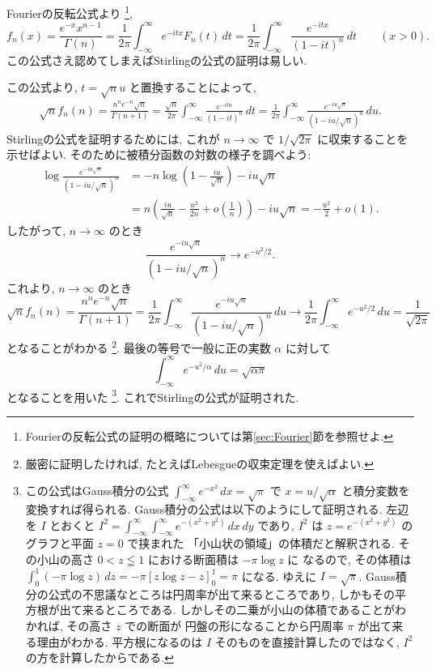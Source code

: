 \documentclass[12pt,twoside]{jarticle}
\theoremstyle{jplain}
\theoremstyle{jplain}
\theoremstyle{jplain}
\numberwithin{theorem}{section}
\numberwithin{equation}{section}
\numberwithin{figure}{section}
\numberwithin{table}{section}
\newcommand\secref[1]{第\ref{#1}節}
\begin{document}
Fourierの反転公式より%
\footnote{Fourierの反転公式の証明の概略については\secref{sec:Fourier}を参照せよ.},
\[
f_n(x)
=
\frac{e^{-x} x^{n-1}}{\Gamma(n)}
=
\frac{1}{2\pi}\int_{-\infty}^\infty e^{-itx}F_n(t)\,dt
=
\frac{1}{2\pi}\int_{-\infty}^\infty \frac{e^{-itx}}{(1-it)^n}\,dt
\qquad (x>0).
\]
この公式さえ認めてしまえばStirlingの公式の証明は易しい.

この公式より, $t=\sqrt{n}u$ と置換することによって,
\begin{align*}
\sqrt{n}f_n(n)
=
\frac{n^n e^{-n}\sqrt{n}}{\Gamma(n+1)}
=
\frac{\sqrt{n}}{2\pi}
\int_{-\infty}^\infty
\frac{e^{-itn}}{(1-it)^n}
\,dt
=
\frac{1}{2\pi}
\int_{-\infty}^\infty
\frac{e^{-iu\sqrt{n}}}{(1-iu/\sqrt{n})^n}\,du.
\end{align*}
Stirlingの公式を証明するためには,
これが $n\to\infty$ で $1/\sqrt{2\pi}$ に収束することを示せばよい.
そのために被積分函数の対数の様子を調べよう:
\begin{align*}
\log\frac{e^{-iu\sqrt{n}}}{(1-iu/\sqrt{n})^n}
&
=-n\log\left(1-\frac{iu}{\sqrt{n}}\right)-iu\sqrt{n}
\\&
=n\left(\frac{iu}{\sqrt{n}}-\frac{u^2}{2n}+o\left(\frac{1}{n}\right)\right)-iu\sqrt{n}
=-\frac{u^2}{2} + o(1).
\end{align*}
したがって, $n\to\infty$ のとき
\[
\frac{e^{-iu\sqrt{n}}}{(1-iu/\sqrt{n})^n} \longrightarrow e^{-u^2/2}.
\]
これより, $n\to\infty$ のとき
\[
\sqrt{n}f_n(n)
=
\frac{n^n e^{-n}\sqrt{n}}{\Gamma(n+1)}
=
\frac{1}{2\pi}
\int_{-\infty}^\infty
\frac{e^{-iu\sqrt{n}}}{(1-iu/\sqrt{n})^n}\,du
\longrightarrow
\frac{1}{2\pi}
\int_{-\infty}^\infty
e^{-u^2/2}\,du
=
\frac{1}{\sqrt{2\pi}}
\]
となることがわかる%
\footnote{厳密に証明したければ, たとえばLebesgueの収束定理を使えばよい.}.
最後の等号で一般に正の実数 $\alpha$ に対して
\[
\int_{-\infty}^\infty e^{-u^2/\alpha}\,du = \sqrt{\alpha\pi}
\]
となることを用いた%
\footnote{この公式はGauss積分の公式
$\int_{-\infty}^\infty e^{-x^2}\,dx=\sqrt{\pi}$
で $x=u/\sqrt{\alpha}$ と積分変数を変換すれば得られる.
Gauss積分の公式は以下のようにして証明される.
左辺を $I$ とおくと
$I^2=\int_{-\infty}^\infty\int_{-\infty}^\infty e^{-(x^2+y^2)}\,dx\,dy$
であり, $I^2$ は $z=e^{-(x^2+y^2)}$ のグラフと平面 $z=0$ で挟まれた
「小山状の領域」の体積だと解釈される.
その小山の高さ $0< z\leqq 1$ における断面積は $-\pi \log z$ に
なるので, その体積は $\int_0^1(-\pi\log z)\,dz=-\pi[z\log z-z]_0^1=\pi$
になる. ゆえに $I=\sqrt{\pi}$.
Gauss積分の公式の不思議なところは円周率が出て来るところであり,
しかもその平方根が出て来るところである.
しかしその二乗が小山の体積であることがわかれば, その高さ $z$ での断面が
円盤の形になることから円周率 $\pi$ が出て来る理由がわかる.
平方根になるのは $I$ そのものを直接計算したのではなく,
$I^2$ の方を計算したからである.
}. %
これでStirlingの公式が証明された.
\end{document}
